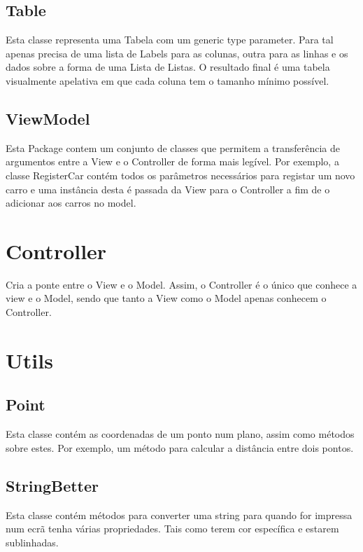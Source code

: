\documentclass[a4paper]{report}
\begin{document}
\subsection{Table}

Esta classe representa uma Tabela com um generic type parameter. Para tal
apenas precisa de uma lista de Labels para as colunas, outra para as linhas e
os dados sobre a forma de uma Lista de Listas.
O resultado final é uma tabela visualmente apelativa em que cada coluna tem o
tamanho mínimo possível.

\subsection{ViewModel}

Esta Package contem um conjunto de classes que permitem a transferência de argumentos
entre a View e o Controller de forma mais legível. Por exemplo, a classe RegisterCar
contém todos os parâmetros necessários para registar um novo carro e uma instância desta
é passada da View para o Controller a fim de o adicionar aos carros no model.

\section{Controller}

Cria a ponte entre o View e o Model. Assim, o Controller é o único que conhece a view e o
Model, sendo que tanto a View como o Model apenas conhecem o Controller.

\section{Utils}

\subsection{Point}

Esta classe contém as coordenadas de um ponto num plano, assim como métodos sobre estes.
Por exemplo, um método para calcular a distância entre dois pontos.

\subsection{StringBetter}

Esta classe contém métodos para converter uma string para quando for
impressa num ecrã tenha várias propriedades. Tais como terem cor
específica e estarem sublinhadas.
\end{document}

